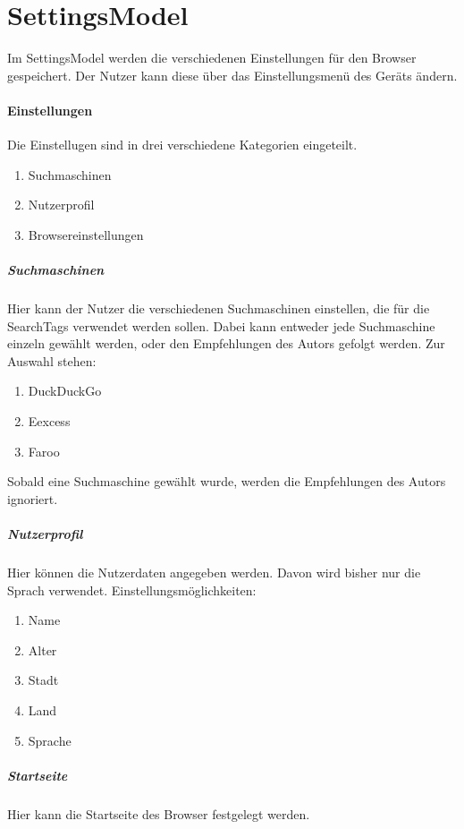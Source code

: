 
\section{SettingsModel}
Im SettingsModel werden die verschiedenen Einstellungen für den Browser gespeichert.
Der Nutzer kann diese über das Einstellungsmenü des Geräts ändern.

\paragraph{Einstellungen}
Die Einstellugen sind in drei verschiedene Kategorien eingeteilt.
\begin{enumerate}  
     \item Suchmaschinen  
     \item Nutzerprofil
     \item Browsereinstellungen
\end{enumerate}

\subparagraph{Suchmaschinen}
Hier kann der Nutzer die verschiedenen Suchmaschinen einstellen, die für die SearchTags verwendet werden sollen.
Dabei kann entweder jede Suchmaschine einzeln gewählt werden, oder den Empfehlungen des Autors gefolgt werden.
Zur Auswahl stehen:
\begin{enumerate}  
     \item DuckDuckGo
     \item Eexcess
     \item Faroo  
\end{enumerate}
Sobald eine Suchmaschine gewählt wurde, werden die Empfehlungen des Autors ignoriert.

\subparagraph{Nutzerprofil}
Hier können die Nutzerdaten angegeben werden.
Davon wird bisher nur die Sprach verwendet.
Einstellungsmöglichkeiten:
\begin{enumerate}  
     \item Name  
     \item Alter  
     \item Stadt
     \item Land
     \item Sprache
\end{enumerate}

\subparagraph{Startseite}
Hier kann die Startseite des Browser festgelegt werden.

